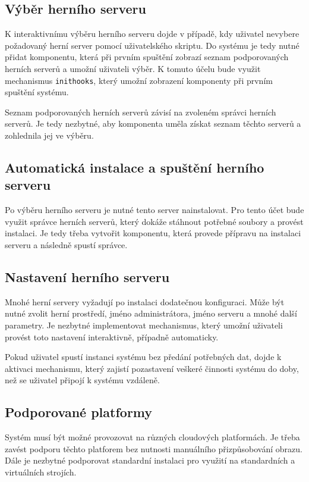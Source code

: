 \subsection{Výběr herního serveru}

K interaktivnímu výběru herního serveru dojde v případě, kdy uživatel nevybere požadovaný herní server pomocí uživatelského skriptu.
Do systému je tedy nutné přidat komponentu, která při prvním spuštění zobrazí seznam podporovaných herních serverů a umožní uživateli výběr.
K tomuto účelu bude využit mechanismus \texttt{inithooks}, který umožní zobrazení komponenty při prvním spuštění systému.

Seznam podporovaných herních serverů závisí na zvoleném správci herních serverů. Je tedy nezbytné, aby komponenta uměla získat seznam těchto serverů
a zohlednila jej ve výběru.

\subsection{Automatická instalace a spuštění herního serveru}

Po výběru herního serveru je nutné tento server nainstalovat. Pro tento účet bude využit správce herních serverů, který dokáže stáhnout potřebné soubory
a provést instalaci. Je tedy třeba vytvořit komponentu, která provede přípravu na instalaci serveru a následně spustí správce.

\subsection{Nastavení herního serveru}

Mnohé herní servery vyžadují po instalaci dodatečnou konfiguraci. Může být nutné zvolit herní prostředí, jméno administrátora, jméno serveru a mnohé další parametry.
Je nezbytné implementovat mechanismus, který umožní uživateli provést toto nastavení interaktivně, případně automaticky.

Pokud uživatel spustí instanci systému bez předání potřebných dat, dojde k aktivaci mechanismu, který zajistí pozastavení veškeré činnosti systému do doby, než
se uživatel připojí k systému vzdáleně.

\subsection{Podporované platformy}

Systém musí být možné provozovat na různých cloudových platformách. Je třeba zavést podporu těchto platforem bez nutnosti manuálního přizpůsobování obrazu.
Dále je nezbytné podporovat standardní instalaci pro využití na standardních a virtuálních strojích.

